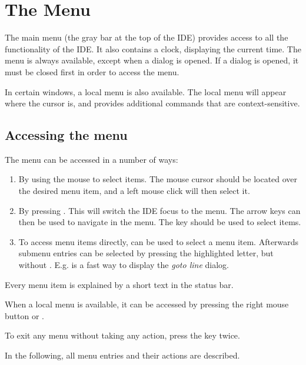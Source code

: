 
\section{The Menu}
\label{se:idemenu}
The main menu (the gray bar at the top of the IDE) provides access to all the
functionality of the IDE. It also contains a clock, displaying the current
time. The menu is always available, except when a dialog is opened. If a
dialog is opened, it must be closed first in order to access the menu.

In certain windows, a local menu is also available. The local menu will
appear where the cursor is, and provides additional commands that are
context-sensitive.
%
%
\subsection{Accessing the menu}
The menu can be accessed in a number of ways:
\begin{enumerate}
\item By using the mouse to select items. The mouse cursor should be located
over the desired menu item, and a left mouse click will then select it.
\item By pressing . This will switch the IDE focus to the menu.
The arrow keys can then be used to navigate in the menu. The
 key should be used to select items.
\item To access menu items directly, 
can be used to select a menu item. Afterwards submenu entries can be selected
by pressing the highlighted letter, but without .
E.g.  is a fast way to display the \emph{goto line} dialog.
\end{enumerate}
Every menu item is explained by a short text in the status bar.

When a local menu is available, it can be accessed by pressing
the right mouse button or .

To exit any menu without taking any action, press the  key
twice.

In the following, all menu entries and their actions are described.
%
%
